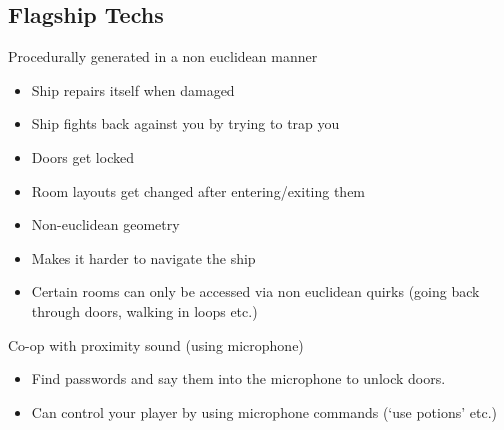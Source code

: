 \documentclass[a4paper]{article} %
\begin{document}
\subsection*{Flagship Techs}
\begin{multicols}{2}
    Procedurally generated in a non euclidean manner
    \begin{itemize}
        \item Ship repairs itself when damaged
        \item Ship fights back against you by trying to trap you
        \item Doors get locked
        \item Room layouts get changed after entering/exiting them
        \item Non-euclidean geometry
        \item Makes it harder to navigate the ship
        \item Certain rooms can only be accessed via non euclidean quirks (going back through doors, walking in loops etc.)
    \end{itemize}\columnbreak
    Co-op with proximity sound (using microphone)
    \begin{itemize}
        \item Find passwords and say them into the microphone to unlock doors.
        \item Can control your player by using microphone commands (‘use potions’ etc.)\vspace{\fill}
    \end{itemize}
\end{multicols}
\end{document}
